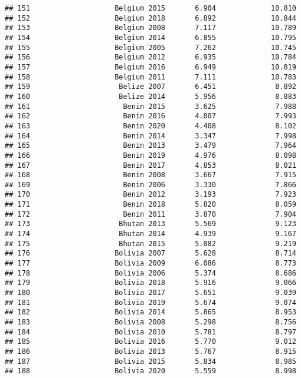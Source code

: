 \documentclass[
]{article}
\begin{document}
\begin{verbatim}
## 151                    Belgium 2015       6.904             10.810
## 152                    Belgium 2018       6.892             10.844
## 153                    Belgium 2008       7.117             10.789
## 154                    Belgium 2014       6.855             10.795
## 155                    Belgium 2005       7.262             10.745
## 156                    Belgium 2012       6.935             10.784
## 157                    Belgium 2016       6.949             10.819
## 158                    Belgium 2011       7.111             10.783
## 159                     Belize 2007       6.451              8.892
## 160                     Belize 2014       5.956              8.883
## 161                      Benin 2015       3.625              7.988
## 162                      Benin 2016       4.007              7.993
## 163                      Benin 2020       4.408              8.102
## 164                      Benin 2014       3.347              7.998
## 165                      Benin 2013       3.479              7.964
## 166                      Benin 2019       4.976              8.098
## 167                      Benin 2017       4.853              8.021
## 168                      Benin 2008       3.667              7.915
## 169                      Benin 2006       3.330              7.866
## 170                      Benin 2012       3.193              7.923
## 171                      Benin 2018       5.820              8.059
## 172                      Benin 2011       3.870              7.904
## 173                     Bhutan 2013       5.569              9.123
## 174                     Bhutan 2014       4.939              9.167
## 175                     Bhutan 2015       5.082              9.219
## 176                    Bolivia 2007       5.628              8.714
## 177                    Bolivia 2009       6.086              8.773
## 178                    Bolivia 2006       5.374              8.686
## 179                    Bolivia 2018       5.916              9.066
## 180                    Bolivia 2017       5.651              9.039
## 181                    Bolivia 2019       5.674              9.074
## 182                    Bolivia 2014       5.865              8.953
## 183                    Bolivia 2008       5.298              8.756
## 184                    Bolivia 2010       5.781              8.797
## 185                    Bolivia 2016       5.770              9.012
## 186                    Bolivia 2013       5.767              8.915
## 187                    Bolivia 2015       5.834              8.985
## 188                    Bolivia 2020       5.559              8.998

\end{verbatim}
\end{document}

